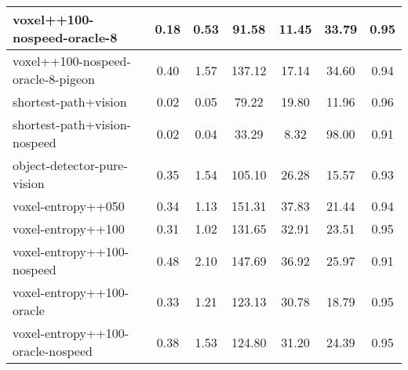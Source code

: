 \begin{sidewaystable}
\begin{longtable}{|l|c|c|c|c|c|c|}
voxel++100-nospeed-oracle-8 & {\cellcolor[HTML]{B8DAD3}} \color[HTML]{000000} 0.18 & {\cellcolor[HTML]{C7E1DB}} \color[HTML]{000000} 0.53 & {\cellcolor[HTML]{A1CFC5}} \color[HTML]{000000} 91.58 & 11.45 & 33.79 & 0.95 \\ \hline
voxel++100-nospeed-oracle-8-pigeon & {\cellcolor[HTML]{6FB6A8}} \color[HTML]{F1F1F1} 0.40 & {\cellcolor[HTML]{7BBCAF}} \color[HTML]{000000} 1.57 & {\cellcolor[HTML]{67B2A3}} \color[HTML]{F1F1F1} 137.12 & 17.14 & 34.60 & 0.94 \\ \hline
shortest-path+vision & {\cellcolor[HTML]{E9F1EF}} \color[HTML]{000000} 0.02 & {\cellcolor[HTML]{EBF2F0}} \color[HTML]{000000} 0.05 & {\cellcolor[HTML]{B1D6CE}} \color[HTML]{000000} 79.22 & 19.80 & 11.96 & 0.96 \\ \hline
shortest-path+vision-nospeed & {\cellcolor[HTML]{EBF2F0}} \color[HTML]{000000} 0.02 & {\cellcolor[HTML]{EBF2F0}} \color[HTML]{000000} 0.04 & {\cellcolor[HTML]{EBF2F0}} \color[HTML]{000000} 33.29 & 8.32 & 98.00 & 0.91 \\ \hline
object-detector-pure-vision & {\cellcolor[HTML]{80BFB2}} \color[HTML]{000000} 0.35 & {\cellcolor[HTML]{7EBEB1}} \color[HTML]{000000} 1.54 & {\cellcolor[HTML]{90C6BB}} \color[HTML]{000000} 105.10 & 26.28 & 15.57 & 0.93 \\ \hline
voxel-entropy++050 & {\cellcolor[HTML]{81BFB3}} \color[HTML]{000000} 0.34 & {\cellcolor[HTML]{9CCCC2}} \color[HTML]{000000} 1.13 & {\cellcolor[HTML]{55AA99}} \color[HTML]{F1F1F1} 151.31 & 37.83 & 21.44 & 0.94 \\ \hline
voxel-entropy++100 & {\cellcolor[HTML]{8EC5BA}} \color[HTML]{000000} 0.31 & {\cellcolor[HTML]{A3D0C7}} \color[HTML]{000000} 1.02 & {\cellcolor[HTML]{6EB6A7}} \color[HTML]{F1F1F1} 131.65 & 32.91 & 23.51 & 0.95 \\ \hline
voxel-entropy++100-nospeed & {\cellcolor[HTML]{55AA99}} \color[HTML]{F1F1F1} 0.48 & {\cellcolor[HTML]{55AA99}} \color[HTML]{F1F1F1} 2.10 & {\cellcolor[HTML]{59AC9B}} \color[HTML]{F1F1F1} 147.69 & 36.92 & 25.97 & 0.91 \\ \hline
voxel-entropy++100-oracle & {\cellcolor[HTML]{85C1B5}} \color[HTML]{000000} 0.33 & {\cellcolor[HTML]{95C9BE}} \color[HTML]{000000} 1.21 & {\cellcolor[HTML]{79BBAE}} \color[HTML]{000000} 123.13 & 30.78 & 18.79 & 0.95 \\ \hline
voxel-entropy++100-oracle-nospeed & {\cellcolor[HTML]{76BAAC}} \color[HTML]{000000} 0.38 & {\cellcolor[HTML]{7EBEB1}} \color[HTML]{000000} 1.53 & {\cellcolor[HTML]{77BAAD}} \color[HTML]{000000} 124.80 & 31.20 & 24.39 & 0.95 \\ \hline
            

\end{longtable}
\end{sidewaystable}
